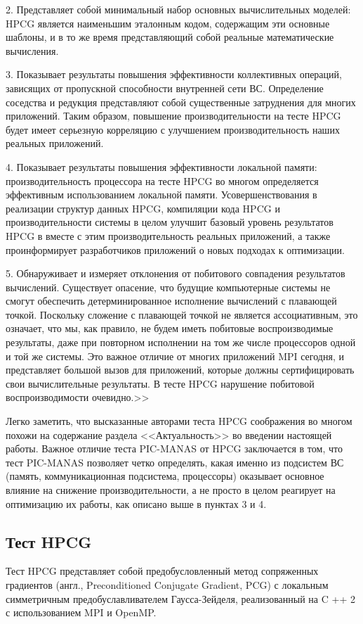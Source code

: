 2. Представляет собой минимальный набор основных вычислительных моделей: HPCG является наименьшим
эталонным кодом, содержащим эти основные шаблоны, и в то же время представляющий собой
реальные математические вычисления.

3. Показывает результаты повышения эффективности коллективных операций, зависящих от пропускной способности внутренней сети ВС. Определение соседства и редукция представляют собой существенные затруднения для многих приложений. Таким образом, повышение производительности на тесте HPCG будет
имеет серьезную корреляцию с улучшением производительность наших реальных приложений.

4. Показывает результаты повышения эффективности локальной памяти: производительность процессора
на тесте HPCG во многом определяется эффективным использованием локальной памяти.
Усовершенствования в реализации структур данных HPCG, компиляции кода HPCG
и производительности системы в целом улучшит базовый уровень результатов HPCG
в вместе с этим производительность реальных приложений, а также проинформирует разработчиков приложений о новых подходах к оптимизации.

5. Обнаруживает и измеряет отклонения от побитового совпадения результатов вычислений.
Существует опасение, что будущие компьютерные системы не смогут обеспечить детерминированное исполнение
 вычислений с плавающей точкой. Поскольку сложение с плавающей точкой не является ассоциативным,
это означает, что мы, как правило, не будем иметь побитовые воспроизводимые результаты, даже при повторном исполнении на том же числе процессоров одной и той же системы.
Это важное отличие от многих приложений MPI сегодня, и представляет большой
вызов для приложений, которые должны сертифицировать свои вычислительные результаты. В тесте  HPCG нарушение побитовой воспроизводимости очевидно.>>

Легко заметить, что высказанные авторами теста HPCG соображения во многом похожи на содержание раздела <<Актуальность>> во введении настоящей работы. Важное отличие теста PIC-MANAS от HPCG заключается в том, что тест PIC-MANAS позволяет четко определять, какая именно из подсистем ВС (память, коммуникационная подсистема, процессоры) оказывает основное влияние на снижение производительности, а не просто в целом реагирует на оптимизацию их работы, как описано выше в пунктах 3 и 4.

\subsection{Тест HPCG}
Тест HPCG представляет собой предобусловленный метод сопряженных градиентов
(англ., Preconditioned Conjugate Gradient, PCG) с локальным симметричным предобуславливателем Гаусса-Зейделя, реализованный на C ++ 2 с использованием MPI и OpenMP. 

